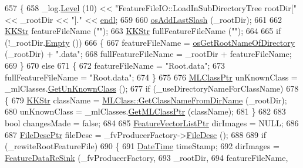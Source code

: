\begin{DoxyCode}
657 \{
658   \_log.\hyperlink{class_k_k_b_1_1_run_log_a32cf761d7f2e747465fd80533fdbb659}{Level} (10) << \textcolor{stringliteral}{"FeatureFileIO::LoadInSubDirectoryTree    rootDir["} << \_rootDir << \textcolor{stringliteral}{"]."} << 
      \hyperlink{namespace_k_k_b_ad1f50f65af6adc8fa9e6f62d007818a8}{endl};
659 
660   \hyperlink{namespace_k_k_b_a60e413a66cd7d3a5679d2844dd5e3d97}{osAddLastSlash} (\_rootDir);
661 
662   \hyperlink{class_k_k_b_1_1_k_k_str}{KKStr}  featureFileName (\textcolor{stringliteral}{""});
663   \hyperlink{class_k_k_b_1_1_k_k_str}{KKStr}  fullFeatureFileName (\textcolor{stringliteral}{""});
664 
665   \textcolor{keywordflow}{if}  (!\_rootDir.\hyperlink{class_k_k_b_1_1_k_k_str_ac69942f73fffd672ec2a6e1c410afdb6}{Empty} ())
666   \{
667     featureFileName = \hyperlink{namespace_k_k_b_a456628fbc248c742b076e5f8b2456c98}{osGetRootNameOfDirectory} (\_rootDir) + \textcolor{stringliteral}{".data"};
668     fullFeatureFileName = \_rootDir + featureFileName;
669   \}
670   \textcolor{keywordflow}{else}
671   \{
672     featureFileName     = \textcolor{stringliteral}{"Root.data"};
673     fullFeatureFileName = \textcolor{stringliteral}{"Root.data"};
674   \}
675 
676   \hyperlink{class_k_k_m_l_l_1_1_m_l_class}{MLClassPtr}  unKnownClass = \_mlClasses.\hyperlink{class_k_k_m_l_l_1_1_m_l_class_list_aa7bab9ad8566d1ae97269775bab02446}{GetUnKnownClass} ();
677   \textcolor{keywordflow}{if}  (\_useDirectoryNameForClassName)
678   \{
679     \hyperlink{class_k_k_b_1_1_k_k_str}{KKStr} className = \hyperlink{class_k_k_m_l_l_1_1_m_l_class_a7e2cfcd8b8ad56e2822668f96c7f8d1e}{MLClass::GetClassNameFromDirName} (\_rootDir);
680     unKnownClass    = \_mlClasses.\hyperlink{class_k_k_m_l_l_1_1_m_l_class_list_ab751a744d6e0d8937ca64b9cdde1488b}{GetMLClassPtr} (className);
681   \}
682 
683   \textcolor{keywordtype}{bool}  changesMade = \textcolor{keyword}{false};
684 
685   \hyperlink{class_k_k_m_l_l_1_1_feature_vector_list}{FeatureVectorListPtr}  dirImages = NULL;
686 
687   \hyperlink{class_k_k_m_l_l_1_1_file_desc}{FileDescPtr}  fileDesc = \_fvProducerFactory->\hyperlink{class_k_k_m_l_l_1_1_factory_f_v_producer_ab2dea2e51cf9d6a109b52300619e185c}{FileDesc} ();
688 
689   \textcolor{keywordflow}{if}  (\_rewiteRootFeatureFile)
690   \{
691     \hyperlink{class_k_k_b_1_1_date_time}{DateTime}  timeStamp;
692     dirImages = \hyperlink{class_k_k_m_l_l_1_1_feature_file_i_o_a287df1dbb04495d7a4dc23b3af1a2ca6}{FeatureDataReSink} (\_fvProducerFactory,
693                                    \_rootDir,
694                                    featureFileName,

\end{DoxyCode}
